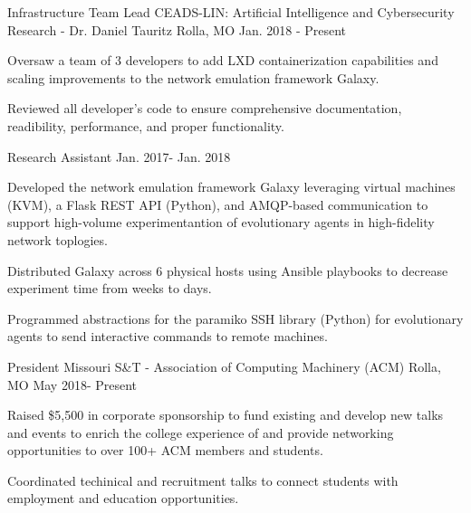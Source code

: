 \begin{cventries}
\cventry
  {Infrastructure Team Lead} %
  {CEADS-LIN: Artificial Intelligence and Cybersecurity Research - Dr. Daniel Tauritz} %
  {Rolla, MO} %
  {Jan. 2018 - Present} %
  {
    \begin{cvitems} %
      \item {Oversaw a team of 3 developers to add LXD containerization capabilities and scaling improvements to the network emulation framework Galaxy.}
      \item {Reviewed all developer's code to ensure comprehensive documentation, readibility, performance, and proper functionality.}
    \end{cvitems}
  }

\cventry
  {Research Assistant} %
  {} %
  {} %
  {Jan. 2017- Jan. 2018} %
  {
    \begin{cvitems} %
      \item {Developed the network emulation framework Galaxy leveraging virtual machines (KVM), a Flask REST API (Python), and AMQP-based communication to support high-volume experimentantion of evolutionary agents in high-fidelity network toplogies.}
			\item {Distributed Galaxy across 6 physical hosts using Ansible playbooks to decrease experiment time from weeks to days.}
      \item {Programmed abstractions for the paramiko SSH library (Python) for evolutionary agents to send interactive commands to remote machines.}
    \end{cvitems}
  }


\cventry
  {President} %
  {Missouri S\&T - Association of Computing Machinery (ACM)} %
  {Rolla, MO} %
  {May 2018- Present} %
  {
    \begin{cvitems} %
      \item {Raised \$5,500 in corporate sponsorship to fund existing and develop new talks and events to enrich the college experience of and provide networking opportunities to over 100+ ACM members and students.} 
      \item {Coordinated techinical and recruitment talks to connect students with employment and education opportunities.}
    \end{cvitems}
  }


\end{cventries}
